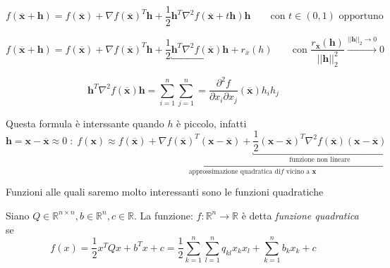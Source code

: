 \begin{defn}
 $$f(\overline{\mathbf{x}}+\mathbf{h}) = f(\overline{\mathbf{x}}) +
 \nabla f(\overline{\mathbf{x}})^T\mathbf{h} + 
 \frac{1}{2}  \mathbf{h}^T \nabla^{2} f(\overline{\mathbf{x}} +
 t  \mathbf{h}) \mathbf{h}
\qquad
\text{con } t \in (0,1) \text{ opportuno}
$$
\end{defn}

\begin{defn}
 $$f(\overline{\mathbf{x}}+\mathbf{h}) = 
f(\overline{\mathbf{x}}) +
 \nabla f(\overline{\mathbf{x}})^T\mathbf{h} + 
 \frac{1}{2} 
\underbracket{ \mathbf{h}^T \nabla^{2} f(\overline{\mathbf{x}}) \mathbf{h}}_{}
+ r_{\overline{x}}(h)
\qquad
\text{con } \dfrac{r_{\overline{\mathbf{x}}}(\mathbf{h})}{||\mathbf{h}||_{2}^{2}}
\xrightarrow{||\mathbf{h}||_{2} \to 0} 0
$$

$$\mathbf{h}^{T} \nabla^{2} f(\overline{\mathbf{x}}) \mathbf{h} =
 \displaystyle \sum_{i=1}^{n} \displaystyle \sum_{j=1}^{n}
 = \frac{{\partial}^2 f}
{{\partial} x_i {\partial} x_j}
(\overline{\mathbf{x}}) h_i h_j$$
\end{defn}
Questa formula è interssante quando $h$ è piccolo, infatti
$$ 
\mathbf{h} = \mathbf{x} - \overline{\mathbf{x}} \approx 0
\; : \;
f(\mathbf{x}) \approx
\underbracket{ f(\overline{\mathbf{x}}) + \nabla f(\overline{\mathbf{x}})^{T} (\mathbf{x}-\overline{\mathbf{x}}) + 
 \underbracket{\frac{1}{2}(\mathbf{x}- \overline{\mathbf{x}})^{T}\nabla^{2} f(\overline{\mathbf{x}})(\mathbf{x}-\overline{\mathbf{x}})}_{\text{funzione non lineare}}}_{\text{approssimazione quadratica di} f  \text{ vicino a } \mathbf{x}} $$

Funzioni alle quali saremo molto interessanti sono le funzioni quadratiche
\begin{defn}
Siano $ Q \in \mathbb{R}^{n \times n}, b \in \mathbb{R}^{n}, c \in \mathbb{R} $.
La funzione: $f: \mathbb{R}^{n} \rightarrow \mathbb{R}$ \`e detta
\emph{funzione quadratica} se 
 $$ 
f(x) =  \frac{1}{2} x^{T} Q x + b^{T}x + c 
=
\frac{1}{2} 
 \displaystyle \sum_{k=1}^{n} \displaystyle \sum_{l=1}^{n}
q_{kl} x_{k}x_{l} + \displaystyle \sum_{k=1}^{n} b_k x_k + c
$$
\end{defn}

